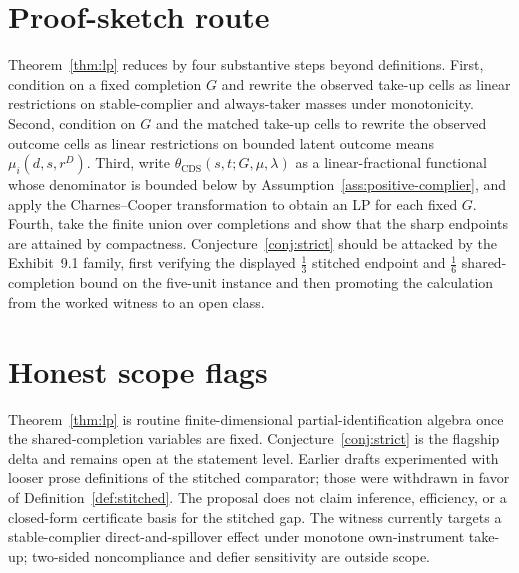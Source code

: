 \documentclass[11pt]{article}
\theoremstyle{definition}
\theoremstyle{plain}
\theoremstyle{remark}
\begin{document}
\section{Proof-sketch route}
Theorem~\ref{thm:lp} reduces by four substantive steps beyond definitions. First, condition on a fixed completion \(G\) and rewrite the observed take-up cells as linear restrictions on stable-complier and always-taker masses under monotonicity. Second, condition on \(G\) and the matched take-up cells to rewrite the observed outcome cells as linear restrictions on bounded latent outcome means \(\mu_i(d,s,r^D)\). Third, write \(\theta_{\mathrm{CDS}}(s,t;G,\mu,\lambda)\) as a linear-fractional functional whose denominator is bounded below by Assumption~\ref{ass:positive-complier}, and apply the Charnes--Cooper transformation to obtain an LP for each fixed \(G\). Fourth, take the finite union over completions and show that the sharp endpoints are attained by compactness. Conjecture~\ref{conj:strict} should be attacked by the Exhibit~9.1 family, first verifying the displayed \(\tfrac13\) stitched endpoint and \(\tfrac16\) shared-completion bound on the five-unit instance and then promoting the calculation from the worked witness to an open class.

\section{Honest scope flags}
Theorem~\ref{thm:lp} is routine finite-dimensional partial-identification algebra once the shared-completion variables are fixed. Conjecture~\ref{conj:strict} is the flagship delta and remains open at the statement level. Earlier drafts experimented with looser prose definitions of the stitched comparator; those were withdrawn in favor of Definition~\ref{def:stitched}. The proposal does not claim inference, efficiency, or a closed-form certificate basis for the stitched gap. The witness currently targets a stable-complier direct-and-spillover effect under monotone own-instrument take-up; two-sided noncompliance and defier sensitivity are outside scope.
\end{document}
